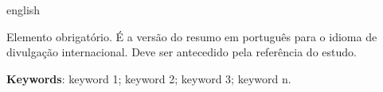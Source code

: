 \setlength{\absparsep}{18pt} %
\begin{resumo}[Abstract]
	
	\begin{otherlanguage*}{english}
		
		Elemento obrigatório. É a versão do resumo em português para o idioma de divulgação internacional. Deve ser antecedido pela referência do estudo.
		
		\vspace{\onelineskip}
		 
		\textbf{Keywords}: keyword 1; keyword 2; keyword 3; keyword n.
		
	\end{otherlanguage*}

\end{resumo} 